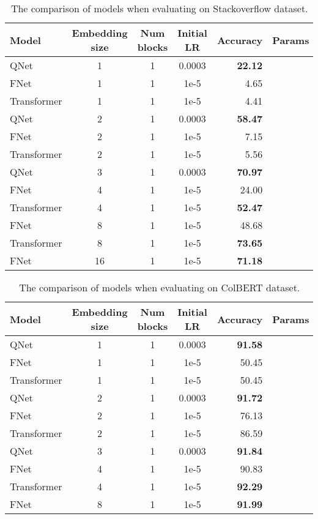 
\begin{table*}[htb!]
    \centering
    \begin{tabular}{ |l|c|c|c|r|c|  }
        \hline
        Model & Embedding size & Num blocks & Initial LR & Accuracy & Params \\
        \hline
        QNet & 1 & 1 & 0.0003 & \textbf{22.12} & \\
        FNet & 1 & 1 & 1e-5 & 4.65 & \\
        Transformer& 1 & 1 & 1e-5 & 4.41 & \\
        \hline
        QNet & 2 & 1 & 0.0003 & \textbf{58.47} & \\
        FNet & 2 & 1 & 1e-5 & 7.15 & \\
        Transformer& 2 & 1 & 1e-5 & 5.56 & \\
        \hline
        QNet & 3 & 1 & 0.0003 & \textbf{70.97} & \\
        \hline
        FNet & 4 & 1 & 1e-5 & 24.00 & \\
        Transformer& 4 & 1 & 1e-5 & \textbf{52.47} & \\
        \hline
        FNet & 8 & 1 & 1e-5 & 48.68 & \\
        Transformer& 8 & 1 & 1e-5 & \textbf{73.65} & \\
        \hline
        FNet & 16 & 1 & 1e-5 & \textbf{71.18} & \\
        \hline
    \end{tabular}
    \caption{The comparison of models when evaluating on Stackoverflow dataset.}
    \label{table:colbert_result}
\end{table*}

\begin{table*}[htb!]
    \centering
    \begin{tabular}{ |l|c|c|c|r|c|  }
        \hline
        Model & Embedding size & Num blocks & Initial LR & Accuracy & Params \\
        \hline
        QNet & 1 & 1 & 0.0003 & \textbf{91.58} & \\
        FNet & 1 & 1 & 1e-5 & 50.45 & \\
        Transformer& 1 & 1 & 1e-5 & 50.45 & \\
        \hline
        QNet & 2 & 1 & 0.0003 & \textbf{91.72} & \\
        FNet & 2 & 1 & 1e-5 & 76.13 & \\
        Transformer& 2 & 1 & 1e-5 & 86.59 & \\
        \hline
        QNet & 3 & 1 & 0.0003 & \textbf{91.84} & \\
        \hline
        FNet & 4 & 1 & 1e-5 & 90.83 & \\
        Transformer& 4 & 1 & 1e-5 & \textbf{92.29} & \\
        \hline
        FNet & 8 & 1 & 1e-5 & \textbf{91.99} & \\
        \hline
    \end{tabular}
    \caption{The comparison of models when evaluating on ColBERT dataset.}
    \label{table:stackoverflow_result}
\end{table*}

